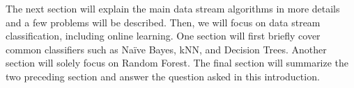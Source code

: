 The next section will explain the main data stream
algorithms in more details and a few problems will
be described.  Then, we will focus on data stream
classification, including online learning. One
section will first briefly cover common
classifiers such as Naïve Bayes, kNN, and Decision
Trees. Another section will solely focus on Random
Forest.  The final section will summarize the two
preceding section and answer the question asked in
this introduction.


